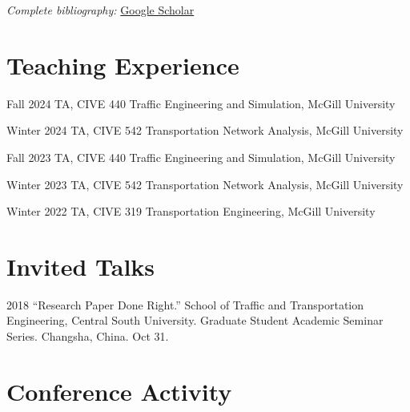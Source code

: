 \documentclass[12pt,letterpaper]{report}
\begin{document}
    \textit{Complete bibliography:} \href{https://scholar.google.com/citations?hl=en&user=h2Et54sAAAAJ&view_op=list_works&sortby=pubdate}{Google Scholar}

    \section*{Teaching Experience}
    \begin{tablist}
        \item[Fall 2024] TA, CIVE 440 Traffic Engineering and Simulation, McGill University
        \item[Winter 2024] TA, CIVE 542 Transportation Network Analysis, McGill University
        \item[Fall 2023] TA, CIVE 440 Traffic Engineering and Simulation, McGill University
        \item[Winter 2023] TA, CIVE 542 Transportation Network Analysis, McGill University
        \item[Winter 2022] TA, CIVE 319 Transportation Engineering, McGill University
    \end{tablist}

    \section*{Invited Talks}
    \begin{tablist}
        \item[2018] \tab \enquote{Research Paper Done Right.} School of Traffic and Transportation Engineering, Central South University. Graduate Student Academic Seminar Series. Changsha, China. Oct 31.
    \end{tablist}

    \section*{Conference Activity}
\end{document}
